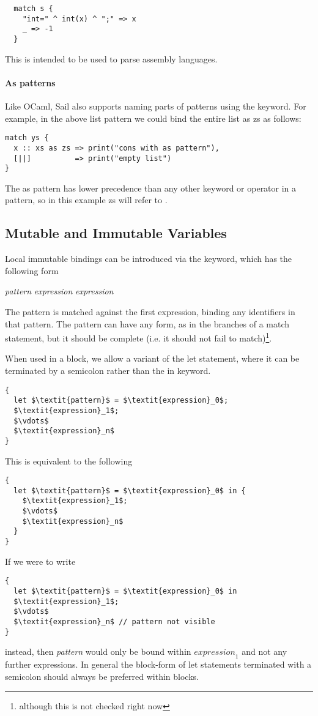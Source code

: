 \begin{lstlisting}
  match s {
    "int=" ^ int(x) ^ ";" => x
    _ => -1
  }
\end{lstlisting}

This is intended to be used to parse assembly languages.


\paragraph{As patterns}

Like OCaml, Sail also supports naming parts of patterns using the
 keyword. For example, in the above list pattern we could bind
the entire list as zs as follows:
\begin{lstlisting}
match ys {
  x :: xs as zs => print("cons with as pattern"),
  [||]          => print("empty list")
}
\end{lstlisting}
The as pattern has lower precedence than any other keyword or operator
in a pattern, so in this example zs will refer to .

\subsection{Mutable and Immutable Variables}

Local immutable bindings can be introduced via the  keyword,
which has the following form
\begin{center}
   \textit{pattern} \ll{=} \textit{expression}  \textit{expression}
\end{center}
The pattern is matched against the first expression, binding any
identifiers in that pattern. The pattern can have any form, as in the
branches of a match statement, but it should be complete (i.e. it
should not fail to match)\footnote{although this is not checked right
  now}.

When used in a block, we allow a variant of the let statement, where
it can be terminated by a semicolon rather than the in keyword.
\begin{lstlisting}[mathescape]
{
  let $\textit{pattern}$ = $\textit{expression}_0$;
  $\textit{expression}_1$;
  $\vdots$
  $\textit{expression}_n$
}
\end{lstlisting}
This is equivalent to the following
\begin{lstlisting}[mathescape]
{
  let $\textit{pattern}$ = $\textit{expression}_0$ in {
    $\textit{expression}_1$;
    $\vdots$
    $\textit{expression}_n$
  }
}
\end{lstlisting}
If we were to write
\begin{lstlisting}[mathescape]
{
  let $\textit{pattern}$ = $\textit{expression}_0$ in
  $\textit{expression}_1$;
  $\vdots$
  $\textit{expression}_n$ // pattern not visible
}
\end{lstlisting}
instead, then \textit{pattern} would only be bound within
$\textit{expression}_1$ and not any further expressions. In general
the block-form of let statements terminated with a semicolon should
always be preferred within blocks.

